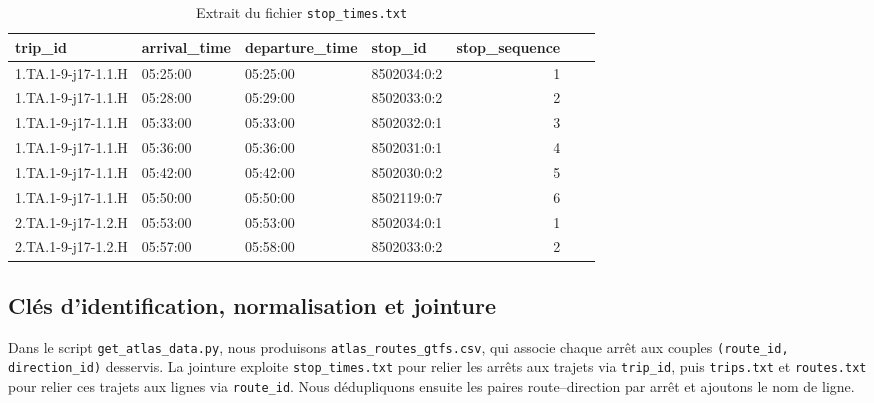 \begin{itemize}
    \begin{table}[H]
    \caption{Extrait du fichier \texttt{stop\_times.txt}}
    \label{tab:stop_times}
    \centering
    \begin{tabular}{l l l l r l l}
    \toprule
    trip\_id & arrival\_time & departure\_time & stop\_id & stop\_sequence \\
    \midrule
    1.TA.1-9-j17-1.1.H & 05:25:00 & 05:25:00 & 8502034:0:2 & 1 \\
    1.TA.1-9-j17-1.1.H & 05:28:00 & 05:29:00 & 8502033:0:2 & 2 \\
    1.TA.1-9-j17-1.1.H & 05:33:00 & 05:33:00 & 8502032:0:1 & 3 \\
    1.TA.1-9-j17-1.1.H & 05:36:00 & 05:36:00 & 8502031:0:1 & 4 \\
    1.TA.1-9-j17-1.1.H & 05:42:00 & 05:42:00 & 8502030:0:2 & 5 \\
    1.TA.1-9-j17-1.1.H & 05:50:00 & 05:50:00 & 8502119:0:7 & 6 \\
    2.TA.1-9-j17-1.2.H & 05:53:00 & 05:53:00 & 8502034:0:1 & 1 \\
    2.TA.1-9-j17-1.2.H & 05:57:00 & 05:58:00 & 8502033:0:2 & 2 \\
    \bottomrule
    \end{tabular}
    \end{table}
\end{itemize}


\subsection{Clés d’identification, normalisation et jointure}

Dans le script \texttt{get\_atlas\_data.py}, nous produisons \texttt{atlas\_routes\_gtfs.csv}, qui associe chaque arrêt aux couples \texttt{(route\_id, direction\_id)} desservis. La jointure exploite \texttt{stop\_times.txt} pour relier les arrêts aux trajets via \texttt{trip\_id}, puis \texttt{trips.txt} et \texttt{routes.txt} pour relier ces trajets aux lignes via \texttt{route\_id}. Nous dédupliquons ensuite les paires route–direction par arrêt et ajoutons le nom de ligne.

